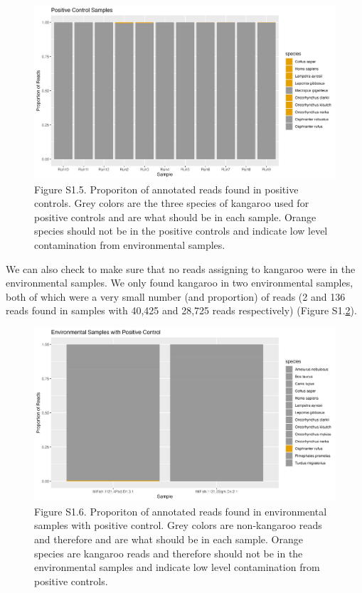 \documentclass[
]{article}
\begin{document}
\begin{figure}
\centering
\includegraphics{../Output/SupplementalFigures/check_controls.png}
\caption{Figure S1.5. Proporiton of annotated reads found in positive
controls. Grey colors are the three species of kangaroo used for
positive controls and are what should be in each sample. Orange species
should not be in the positive controls and indicate low level
contamination from environmental samples.\label{fig:controls1}}
\end{figure}

We can also check to make sure that no reads assigning to kangaroo were
in the environmental samples. We only found kangaroo in two
environmental samples, both of which were a very small number (and
proportion) of reads (2 and 136 reads found in samples with 40,425 and
28,725 reads respectively) (Figure S1.\ref{fig:controls2}).

\begin{figure}
\centering
\includegraphics{../Output/SupplementalFigures/check_controls2.png}
\caption{Figure S1.6. Proporiton of annotated reads found in
environmental samples with positive control. Grey colors are
non-kangaroo reads and therefore and are what should be in each sample.
Orange species are kangaroo reads and therefore should not be in the
environmental samples and indicate low level contamination from positive
controls.\label{fig:controls2}}
\end{figure}
\end{document}

